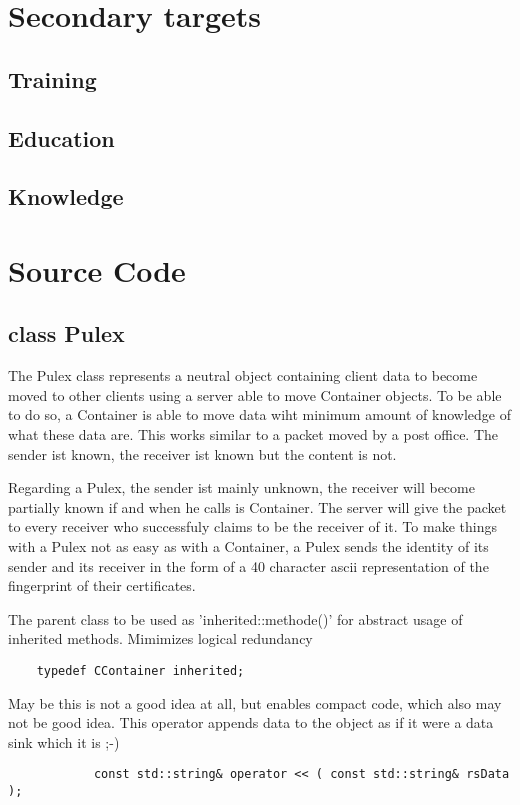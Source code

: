 \documentclass[twoside,a4paper,english,12pt,authoryear,openright]{book}
\begin{document}
\section{Secondary targets}

\subsection{Training}

\subsection{Education}

\subsection{Knowledge}


\section{Source Code}


\subsection{class Pulex}

The Pulex class represents a neutral object containing client data to become moved to other clients using a server able to move Container objects. To be able to do so, a Container is able to move data wiht minimum amount of knowledge of what these data are. This works similar to a packet moved by a post office. The sender ist known, the receiver ist known but the content is not.
 
Regarding a Pulex, the sender ist mainly unknown, the receiver will become partially known if and when he calls is Container. The server will give the packet to every receiver who successfuly claims to be the receiver of it. To make things with a Pulex not as easy as with a Container, a Pulex sends the identity of its sender and its receiver in the form of a 40 character ascii representation of the fingerprint of their certificates.


 The parent class to be used as 'inherited::methode()' for abstract usage of inherited methods. Mimimizes logical redundancy
\begin{lstlisting}
    typedef CContainer inherited;
\end{lstlisting}

May be this is not a good idea at all, but enables compact code, which also may not be good idea. This operator appends data to the object as if it were a data sink which it is ;-)
\begin{lstlisting}
            const std::string& operator << ( const std::string& rsData );
\end{lstlisting}
\end{document}
